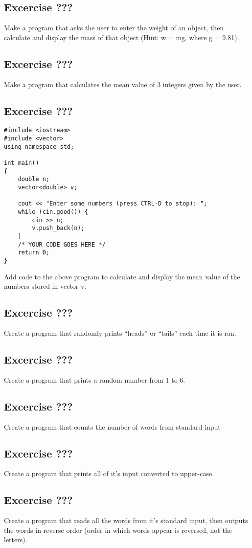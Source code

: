 \documentclass[a4paper,12pt]{article}
\begin{document}
\subsection*{Excercise ???}

Make a program that asks the user to enter the weight of an object, then calculate and display the mass of that object (Hint: w = mg, where g = 9.81).

\subsection*{Excercise ???}

Make a program that calculates the mean value of 3 integers given by the user.

\subsection*{Excercise ???}

\begin{lstlisting}[caption=avg.cpp]
#include <iostream>
#include <vector>
using namespace std;

int main()
{
	double n;
	vector<double> v;

	cout << "Enter some numbers (press CTRL-D to stop): ";
	while (cin.good()) {
		cin >> n;
		v.push_back(n);
	}
	/* YOUR CODE GOES HERE */
	return 0;
}
\end{lstlisting}

Add code to the above program to calculate and display the mean value of the numbers stored in vector v.

\subsection*{Excercise ???}

Create a program that randomly prints ``heads'' or ``tails'' each time it is ran.

\subsection*{Excercise ???}

Create a program that prints a random number from 1 to 6.

\subsection*{Excercise ???}

Create a program that counts the number of words from standard input

\subsection*{Excercise ???}

Create a program that prints all of it's input converted to upper-case.

\subsection*{Excercise ???}

Create a program that reads all the words from it's standard input, then outputs the words in reverse order (order in which words appear is reversed, not the letters).
\end{document}
